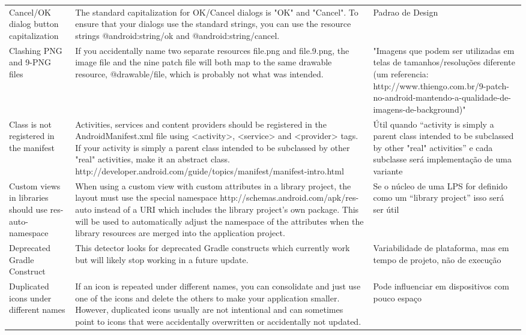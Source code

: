 \begin{landscape}
\begin{longtable}{p{30mm}|p{180mm}|p{25mm}}
Cancel/OK dialog button capitalization
&The standard capitalization for OK/Cancel dialogs is "OK" and "Cancel". To ensure that your dialogs use the standard strings, you can use the resource strings @android:string/ok and @android:string/cancel.
&Padrao de Design\\

Clashing PNG and 9-PNG files
&If you accidentally name two separate resources file.png and file.9.png, the image file and the nine patch file will both map to the same drawable resource, @drawable/file, which is probably not what was intended.
&"Imagens que podem ser utilizadas em telas de tamanhos/resoluções diferente
(um referencia: http://www.thiengo.com.br/9-patch-no-android-mantendo-a-qualidade-de-imagens-de-background)"\\

Class is not registered in the manifest
&Activities, services and content providers should be registered in the AndroidManifest.xml file using <activity>, <service> and <provider> tags. If your activity is simply a parent class intended to be subclassed by other "real" activities, make it an abstract class. http://developer.android.com/guide/topics/manifest/manifest-intro.html
&Útil quando “activity is simply a parent class intended to be subclassed by other "real" activities” e cada subclasse será implementação de uma variante\\

Custom views in libraries should use res-auto-namespace
&When using a custom view with custom attributes in a library project, the layout must use the special namespace http://schemas.android.com/apk/res-auto instead of a URI which includes the library project's own package. This will be used to automatically adjust the namespace of the attributes when the library resources are merged into the application project.
&Se o núcleo de uma LPS for definido como um “library project” isso será ser útil\\

Deprecated Gradle Construct
&This detector looks for deprecated Gradle constructs which currently work but will likely stop working in a future update.
&Variabilidade de plataforma, mas em tempo de projeto, não de execução\\

Duplicated icons under different names
&If an icon is repeated under different names, you can consolidate and just use one of the icons and delete the others to make your application smaller. However, duplicated icons usually are not intentional and can sometimes point to icons that were accidentally overwritten or accidentally not updated.
&Pode influenciar em dispositivos com pouco espaço\\


\end{longtable}
\end{landscape}
